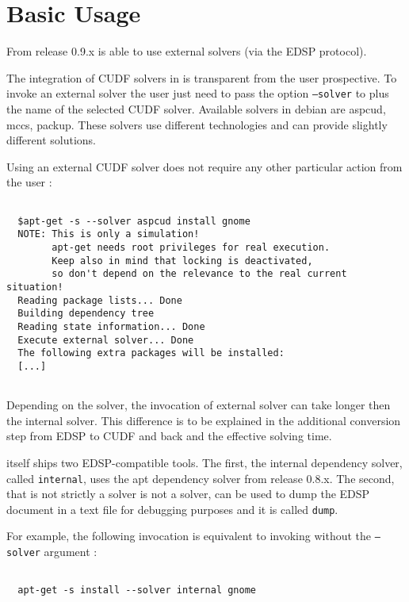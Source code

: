 \section{Basic Usage}

From release 0.9.x \aptget is able to use external solvers (via the
EDSP protocol).


The integration of CUDF solvers in \aptget is transparent from the
user prospective. To invoke an external solver the user just need to
pass the option \texttt{--solver} to \aptget plus the name of the
selected CUDF solver. Available solvers in debian are aspcud, mccs,
packup. These solvers use different technologies and can provide
slightly different solutions.

Using an external CUDF solver does not require any other particular
action from the user :

\begin{verbatim}
 
  $apt-get -s --solver aspcud install gnome
  NOTE: This is only a simulation!
        apt-get needs root privileges for real execution.
        Keep also in mind that locking is deactivated,
        so don't depend on the relevance to the real current situation!
  Reading package lists... Done
  Building dependency tree       
  Reading state information... Done
  Execute external solver... Done
  The following extra packages will be installed:
  [...]
 
\end{verbatim}

Depending on the solver, the invocation of external solver can take
longer then the \aptget internal solver. This difference is to be
explained in the additional conversion step from EDSP to CUDF and back
and the effective solving time.

\aptget itself ships two EDSP-compatible tools. The first, the
internal \aptget dependency solver, called \texttt{internal}, uses the
apt dependency solver from release 0.8.x. The second, that is not
strictly a solver is not a solver, can be used to dump the EDSP
document in a text file for debugging purposes and it is called
\texttt{dump}.

For example, the following invocation is equivalent to invoking
\aptget without the \texttt{--solver} argument :

\begin{verbatim}

  apt-get -s install --solver internal gnome

\end{verbatim}
